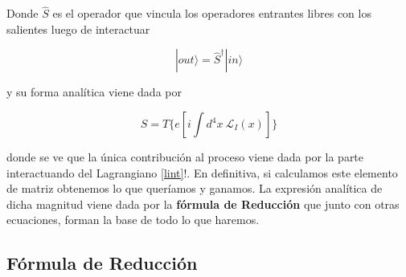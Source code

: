 \documentclass[tickz]{article}
\numberwithin{equation}{section}
\begin{document}
Donde $\hat{S}$ es el operador que vincula los operadores entrantes libres con los salientes luego de interactuar

\begin{equation}\label{key}
|out\rangle=\hat{S}^{\dagger}|in\rangle
\end{equation}

y su forma analítica viene dada por

\begin{equation}\label{key}
S=T\{e\left[i\int d^4 x \ \mathcal{L}_I(x)\right]\}
\end{equation} 

donde se ve que la única contribución al proceso viene dada por la parte interactuando del Lagrangiano \ref{lint}!. En definitiva, si calculamos este elemento de matriz obtenemos lo que queríamos y ganamos. La expresión analítica de dicha magnitud
viene dada por la \textbf{fórmula de Reducción} que
junto con otras ecuaciones, forman la base de todo lo que haremos.

\subsection{Fórmula de Reducción}
\end{document}
